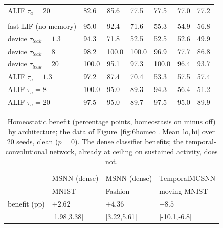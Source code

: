 \begin{table}[H]
\begin{center}
\begin{tabularx}{\textwidth}{@{}l *{6}{Y}@{}}
    ALIF $\tau_a{=}20$  & 82.6 & 85.6 & 77.5 & 77.5 & 77.0 & 77.2 \\
    \addlinespace
    \\
    fast LIF (no memory) & 95.0 & 92.4 & 71.6 & 55.3 & 54.9 & 56.8 \\
    device $\tau_{leak}{=}1.3$ & 94.3 & 71.8 & 52.5 & 52.5 & 52.6 & 49.9 \\
    device $\tau_{leak}{=}8$   & 98.2 & 100.0 & 100.0 & 96.9 & 77.7 & 86.8 \\
    device $\tau_{leak}{=}20$  & 100.0 & 95.1 & 97.3 & 100.0 & 96.4 & 93.7 \\
    ALIF $\tau_a{=}1.3$ & 97.2 & 87.4 & 70.4 & 53.3 & 57.5 & 57.4 \\
    ALIF $\tau_a{=}8$   & 100.0 & 95.0 & 89.3 & 94.3 & 56.4 & 51.2 \\
    ALIF $\tau_a{=}20$  & 97.5 & 95.0 & 89.7 & 97.5 & 95.0 & 89.9 \\
    \bottomrule
    \end{tabularx}
    \label{table:E14}
    \end{center}
    \vspace*{-\baselineskip}
\end{table}

\begin{table}[H]
    \caption[Source data: homeostatic benefit by architecture (Fig.~\ref{fig:6homeo}).]{Homeostatic
    benefit (percentage points, homeostasis on minus off) by architecture; the data of
    Figure~\ref{fig:6homeo}. Mean\,[lo,\,hi] over $20$ seeds, clean ($p{=}0$). The dense
    classifier benefits; the temporal-convolutional network, already at ceiling on
    sustained activity, does not.}
    \begin{center}
    \footnotesize
    \begin{tabularx}{\textwidth}{@{}l *{3}{Y}@{}}
    \toprule
     & MSNN (dense) & MSNN (dense) & TemporalMCSNN \\
     & MNIST & Fashion & moving-MNIST \\
    \midrule
    benefit (pp) & $+2.62$ & $+4.36$ & $-8.5$ \\
    \;[lo,\,hi] & \tiny[1.98,3.38] & \tiny[3.22,5.61] & \tiny[-10.1,-6.8] \\
    \bottomrule
    \end{tabularx}
    \label{table:E15}
    \end{center}
    \vspace*{-\baselineskip}
\end{table}

\FloatBarrier
